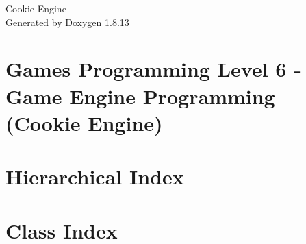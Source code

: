 \documentclass[twoside]{book}
\newcommand{\+}{\discretionary{\mbox{\scriptsize$\hookleftarrow$}}{}{}}
\newcommand{\clearemptydoublepage}{%
  \newpage{\pagestyle{empty}\cleardoublepage}%
}
\begin{document}
\hypersetup{pageanchor=false,
             bookmarksnumbered=true,
             pdfencoding=unicode
            }
\begin{titlepage}
\vspace*{7cm}
\begin{center}%
{\Large Cookie Engine }\\
\vspace*{1cm}
{\large Generated by Doxygen 1.8.13}\\
\end{center}
\end{titlepage}
\clearemptydoublepage
{}
\tableofcontents
\clearemptydoublepage
{}
\hypersetup{pageanchor=true}

\chapter{Games Programming Level 6 -\/ Game Engine Programming (Cookie Engine)}
\label{index}\hypertarget{index}{}
\chapter{Hierarchical Index}

\chapter{Class Index}

\end{document}
